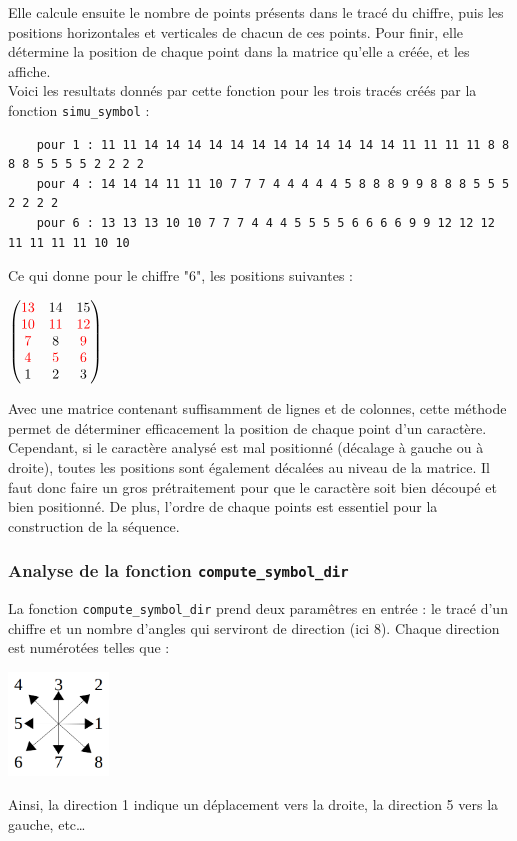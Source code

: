 Elle calcule ensuite le nombre de points présents dans le tracé du chiffre, puis les positions horizontales et verticales de chacun de ces points. Pour finir, elle détermine la position de chaque point dans la matrice qu'elle a créée, et les affiche.\\

Voici les resultats donnés par cette fonction pour les trois tracés créés par la fonction \texttt{simu\_symbol} :
\begin{lstlisting}
	pour 1 : 11 11 14 14 14 14 14 14 14 14 14 14 14 14 11 11 11 11 8 8 8 8 5 5 5 5 2 2 2 2 
	pour 4 : 14 14 14 11 11 10 7 7 7 4 4 4 4 4 5 8 8 8 9 9 8 8 8 5 5 5 2 2 2 2 
	pour 6 : 13 13 13 10 10 7 7 7 4 4 4 5 5 5 5 6 6 6 6 9 9 12 12 12 11 11 11 11 10 10 
\end{lstlisting}
Ce qui donne pour le chiffre "6", les positions suivantes :
\begin{center}
	$\begin{pmatrix}
		 \textcolor{red}{13} & 14 & 15 \\
		\textcolor{red}{10} & \textcolor{red}{11} & \textcolor{red}{12} \\
		\textcolor{red}{7} & 8 & \textcolor{red}{9} \\
		\textcolor{red}{4} & \textcolor{red}{5} & \textcolor{red}{6} \\
		1 & 2 & 3
	\end{pmatrix}$
\end{center}

Avec une matrice contenant suffisamment de lignes et de colonnes, cette méthode permet de déterminer efficacement la position de chaque point d'un caractère. Cependant, si le caractère analysé est mal positionné (décalage à gauche ou à droite), toutes les positions sont également décalées au niveau de la matrice. Il faut donc faire un gros prétraitement pour que le caractère soit bien découpé et bien positionné. De plus, l'ordre de chaque points est essentiel pour la construction de la séquence.

\subsubsection*{Analyse de la fonction \texttt{compute\_symbol\_dir}}
La fonction \texttt{compute\_symbol\_dir} prend deux paramêtres en entrée : le tracé d'un chiffre et un nombre d'angles qui serviront de direction (ici 8). Chaque direction est numérotées telles que :
\begin{center}
	\includegraphics[width=0.20\textwidth]{Figures/direction.jpg}
\end{center}
Ainsi, la direction 1 indique un déplacement vers la droite, la direction 5 vers la gauche, etc\dots \\

